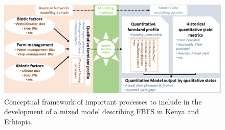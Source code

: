 \documentclass[11pt,preprint]{article}
\begin{document}
\begin{figure}[!htbp]
    \centering
    \includegraphics{figures/Modelling_FBFS_conceptual_framework}
    \caption{Conceptual framework of important processes to include in the development of a mixed     model describing FBFS in Kenya and Ethiopia.
    \label{Figure_2}}
\end{figure}
\end{document}
